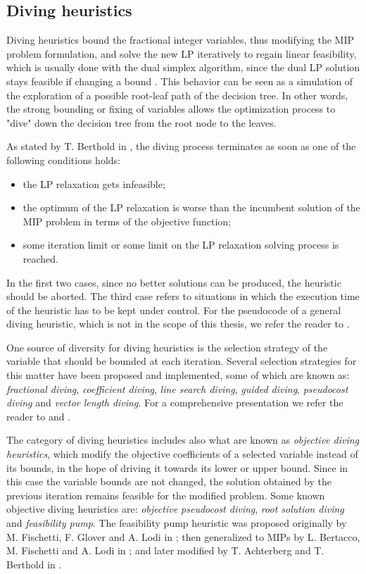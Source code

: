 \documentclass[a4paper,12pt,twoside]{scrbook}
\begin{document}
\subsection{Diving heuristics} \label{sec:divingheur}
Diving heuristics bound the fractional integer variables, thus modifying the MIP problem formulation, and solve the new LP iteratively to regain linear feasibility, which is usually done with the dual simplex algorithm, since the dual LP solution stays feasible if changing a bound \cite{berthold2006}. This behavior can be seen as a simulation of the exploration of a possible root-leaf path of the decision tree. In other words, the strong bounding or fixing of variables allows the optimization process to "dive" down the decision tree from the root node to the leaves. \par 
As stated by T. Berthold in \cite{berthold2006}, the diving process terminates as soon as one of the following conditions holds:
\begin{itemize}
	\item the LP relaxation gets infeasible;
	\item the optimum of the LP relaxation is worse than the incumbent solution of the MIP problem in terms of the objective function;
	\item some iteration limit or some limit on the LP relaxation solving process is reached.
\end{itemize}
In the first two cases, since no better solutions can be produced, the heuristic should be aborted. The third case refers to situations in which the execution time of the heuristic has to be kept under control. For the pseudocode of a general diving heuristic, which is not in the scope of this thesis, we refer the reader to \cite{berthold2006}. \par 
One source of diversity for diving heuristics is the selection strategy of the variable that should be bounded at each iteration. Several selection strategies for this matter have been proposed and implemented, some of which are known as: \textit{fractional diving}, \textit{coefficient diving}, \textit{line search diving}, \textit{guided diving}, \textit{pseudocost diving} and \textit{vector length diving}. For a comprehensive presentation we refer the reader to \cite{berthold2006} and \cite{hendel2011}. \par 
The category of diving heuristics includes also what are known as \textit{objective diving heuristics}, which modify the objective coefficients of a selected variable instead of its bounds, in the hope of driving it towards its lower or upper bound. Since in this case the variable bounds are not changed, the solution obtained by the previous iteration remains feasible for the modified problem. Some known objective diving heuristics are: \textit{objective pseudocost diving}, \textit{root solution diving} and \textit{feasibility pump}. The feasibility pump heuristic was proposed originally by M. Fischetti, F. Glover and A. Lodi in \cite{fischetti2005}; then generalized to MIPs by L. Bertacco, M. Fischetti and A. Lodi in \cite{bertacco2007}; and later modified by T. Achterberg and T. Berthold in \cite{achterberg2007}.
\end{document}
